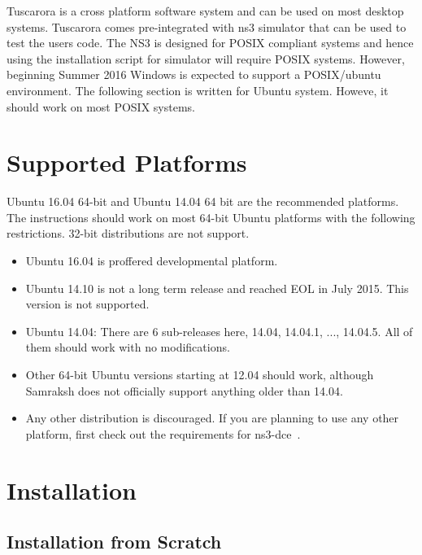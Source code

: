 
Tuscarora is a cross platform software system and can be used on most desktop systems. Tuscarora comes pre-integrated with ns3 simulator that can be used to test the users code. The NS3 is designed for POSIX compliant systems and hence using the installation script for simulator will require POSIX systems. However, beginning Summer 2016 Windows is expected to support a POSIX/ubuntu environment. The following section is written for Ubuntu system. Howeve, it should work on most POSIX systems.


\section{Supported Platforms}
Ubuntu 16.04 64-bit and Ubuntu 14.04 64 bit are the recommended platforms. The instructions should work on most 64-bit Ubuntu platforms with the following restrictions.  32-bit distributions are not support.

\begin{itemize}
	\item Ubuntu 16.04 is proffered developmental platform. 
	\item Ubuntu 14.10 is not a long term release and reached EOL in July 2015. This version is not supported. %
	\item Ubuntu 14.04: There are 6 sub-releases here, 14.04, 14.04.1, ..., 14.04.5. All of them should work with no modifications.
	\item Other 64-bit Ubuntu versions starting at 12.04 should work, although Samraksh does not officially support anything older than 14.04.
	\item Any other distribution is discouraged. If you are planning to
	  use any other platform, first check out the requirements for ns3-dce~\cite{dce}.
\end{itemize}

\section{Installation}

\subsection{Installation from Scratch} \label{subsec:InstallationFromScratch}

